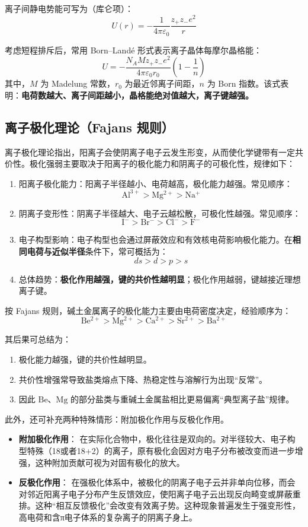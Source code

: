\documentclass[UTF8]{ctexbook}
\begin{document}
离子间静电势能可写为（库仑项）：
\[
U(r)=-\frac{1}{4\pi\varepsilon_0}\frac{z_{+}z_{-}e^2}{r}
\]

考虑短程排斥后，常用 Born--Land\'e 形式表示离子晶体每摩尔晶格能：
\[
U=-\frac{N_A M z_{+}z_{-}e^2}{4\pi\varepsilon_0 r_0}\left(1-\frac{1}{n}\right)
\]
其中，$M$ 为 Madelung 常数，$r_0$ 为最近邻离子间距，$n$ 为 Born 指数。该式表明：\textbf{电荷数越大、离子间距越小，晶格能绝对值越大，离子键越强。}


\subsection{离子极化理论（Fajans 规则）}

离子极化理论指出，阳离子会使阴离子电子云发生形变，从而使化学键带有一定共价性。极化强弱主要取决于阳离子的极化能力和阴离子的可极化性，规律如下：

\begin{enumerate}
  \item 阳离子极化能力：阳离子半径越小、电荷越高，极化能力越强。常见顺序：
\[
\mathrm{Al^{3+} > Mg^{2+} > Na^{+}}
\]

\item 阴离子变形性：阴离子半径越大、电子云越松散，可极化性越强。常见顺序：
\[
\mathrm{I^{-} > Br^{-} > Cl^{-} > F^{-}}
\]
\item 电子构型影响：电子构型也会通过屏蔽效应和有效核电荷影响极化能力。在\textbf{相同电荷与近似半径}条件下，常可概括为：
\[
  ds > d > p > s
\]
\item 总体趋势：\textbf{极化作用越强，键的共价性越明显}；极化作用越弱，键越接近理想离子键。

\end{enumerate}



按 Fajans 规则，碱土金属离子的极化能力主要由电荷密度决定，经验顺序为：
\[
\mathrm{Be^{2+} > Mg^{2+} > Ca^{2+} > Sr^{2+} > Ba^{2+}}
\]

其后果可总结为：
\begin{enumerate}
  \item 极化能力越强，键的共价性越明显。
  \item 共价性增强常导致盐类熔点下降、热稳定性与溶解行为出现“反常”。
  \item 因此 $\mathrm{Be}$、$\mathrm{Mg}$ 的部分盐类与重碱土金属盐相比更易偏离“典型离子盐”规律。
\end{enumerate}

此外，还可补充两种特殊情形：附加极化作用与反极化作用。

\begin{itemize}

\item \textbf{附加极化作用}：
在实际化合物中，极化往往是双向的。对半径较大、电子构型特殊（18或者18+2）的离子，原有极化会因对方电子分布被改变而进一步增强，这种附加贡献可视为对固有极化的放大。

\item \textbf{反极化作用}：
在强极化体系中，被极化的阴离子电子云并非单向位移，而会对邻近阳离子电子分布产生反馈效应，使阳离子电子云出现反向畸变或屏蔽重排。这种“相互反馈极化”会改变有效离子势。这种现象普遍发生于强变形性，高电荷和含π电子体系的复杂离子的阴离子身上。

\end{itemize}
\end{document}
